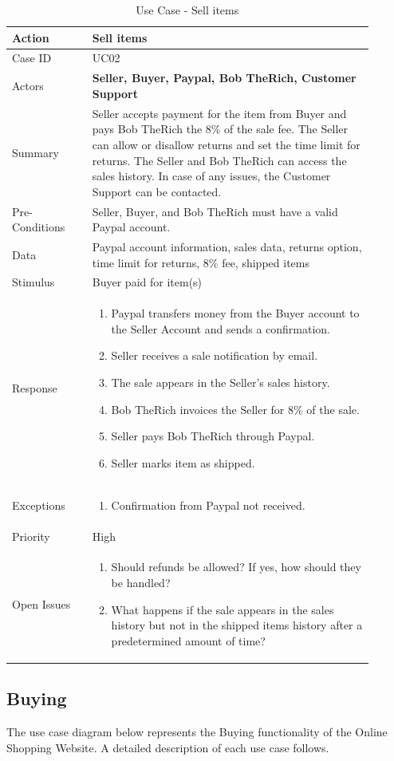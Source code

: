 \documentclass[11pt]{article}
\newcounter{use case ID}
\newcommand\tabularhead[1]{
    \begin{table}[ht]
        \addtocounter{use case ID}{1}
        \caption{Use Case \arabic{use case ID} - #1}
        \vspace{0.2cm}
        \begin{tabular}{|p{0.2\linewidth}|p{0.70\linewidth}|}
            \hline
            \textbf{Action} & \textbf{#1} \\
            \hline}
\newcommand\addrow[2]{#1 & #2\\ \hline}
\newcommand\addmulrow[2]{ \begin{minipage}[t][][t]{2.5cm}#1\end{minipage}
                &\begin{minipage}[t][][t]{11cm}
                    \begin{enumerate}[itemsep=-1ex] #2   \end{enumerate}
                \end{minipage}\vfill\\ \hline}
\newenvironment{usecase}{\tabularhead}
        {\hline\end{tabular}\end{table}}
\begin{document}
\begin{usecase}{Sell items}
    \addrow{Case ID}{UC02}
    \addrow{Actors}{\textbf{Seller, Buyer, Paypal, Bob TheRich, Customer Support}}
    \addrow{Summary}{Seller accepts payment for the item from Buyer and pays Bob TheRich the 8\% of the sale fee. The Seller can allow or disallow returns and set the time limit for returns. The Seller and Bob TheRich can access the sales history. In case of any issues, the Customer Support can be contacted.}
    \addrow{Pre-Conditions}{Seller, Buyer, and Bob TheRich must have a valid Paypal account. }
    \addrow{Data}{Paypal account information, sales data, returns option, time limit for returns, 8\% fee, shipped items}
    \addrow{Stimulus}{Buyer paid for item(s)}
    \addmulrow{Response}{
            \item Paypal transfers money from the Buyer account to the Seller Account and sends a confirmation.
            \item Seller receives a sale notification by email.
            \item The sale appears in the Seller’s sales history.
            \item Bob TheRich invoices the Seller for 8\% of the sale. 
            \item Seller pays Bob TheRich through Paypal. 
            \item Seller marks item as shipped. 
    }
        
    \addmulrow{Exceptions}{
            \item Confirmation from Paypal not received.
    }
    \addrow{Priority}{High}
    \addmulrow{Open Issues}{
            \item Should refunds be allowed? If yes, how should they be handled?
            \item What happens if the sale appears in the sales history but not in the shipped items history after a predetermined amount of time?
    }
\end{usecase}
\clearpage

\subsection{Buying}

The use case diagram below represents the Buying functionality of the Online Shopping Website. A detailed description of each use case follows. 
\end{document}
